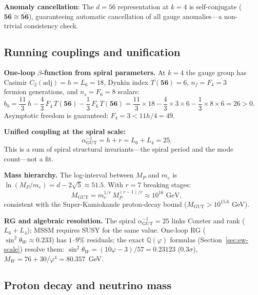 \documentclass[12pt,a4paper]{article}
\begin{document}
\textbf{Anomaly cancellation}: The $d = 56$ representation at $k = 4$ is self-conjugate ($\mathbf{56} \cong \overline{\mathbf{56}}$), guaranteeing automatic cancellation of all gauge anomalies---a non-trivial consistency check.

\subsection{Running couplings and unification}

\textbf{One-loop $\beta$-function from spiral parameters.} At $k = 4$ the gauge group has Casimir $C_2(\mathrm{adj}) = h = L_6 = 18$, Dynkin index $T(\mathbf{56}) = 6$, $n_f = F_4 = 3$ fermion generations, and $n_s = F_6 = 8$ scalars:
\begin{equation}
b_0 = \frac{11}{3}\,h - \frac{4}{3}\,F_4\,T(\mathbf{56}) - \frac{1}{3}\,F_6\,T(\mathbf{56})
    = \frac{11}{3}\times 18 - \frac{4}{3}\times 3 \times 6 - \frac{1}{3}\times 8 \times 6 = 26 > 0.
\end{equation}
Asymptotic freedom is guaranteed: $F_4 = 3 < 11h/4 = 49\!.$

\textbf{Unified coupling at the spiral scale:}
\begin{equation}
\boxed{\alpha_{\mathrm{GUT}}^{-1} = h + r = L_6 + L_4 = 25.}
\end{equation}
This is a sum of spiral structural invariants---the spiral period and the mode count---not a fit.

\textbf{Mass hierarchy.} The log-interval between $M_P$ and $m_e$ is $\ln(M_P/m_e) = d - 2\sqrt{5} \approx 51.5$. With $r = 7$ breaking stages:
\begin{equation}
M_{\mathrm{GUT}} = m_e^{1/r}\,M_P^{(r-1)/r} \approx 10^{16}\text{ GeV},
\end{equation}
consistent with the Super-Kamiokande proton-decay bound ($M_{\mathrm{GUT}} > 10^{15.6}$ GeV).

\textbf{RG and algebraic resolution.} The spiral $\alpha_{\mathrm{GUT}}^{-1} = 25$ links Coxeter and rank ($L_6 + L_4$); MSSM requires SUSY for the same value. One-loop RG ($\sin^2\theta_W \approx 0.233$) has $1$--$9\%$ residuals; the exact $\mathbb{Q}(\varphi)$ formulas (Section~\ref{sec:ew-scale}) resolve them: $\sin^2\theta_W = (10\varphi{-}3)/57 = 0.23123$ ($0.3\sigma$), $M_W = 76 + 30/\varphi^4 = 80.357$~GeV.

\subsection{Proton decay and neutrino mass}
\label{sec:proton-decay}
\end{document}
